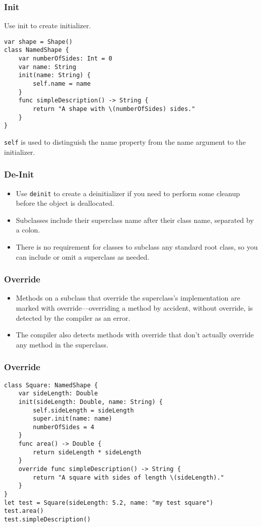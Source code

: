 \begin{frame}[fragile] \frametitle{Init}
Use init to create initializer.

\begin{lstlisting}
var shape = Shape()
class NamedShape {
    var numberOfSides: Int = 0
    var name: String
    init(name: String) {
        self.name = name
    }
    func simpleDescription() -> String {
        return "A shape with \(numberOfSides) sides."
    }
}
\end{lstlisting}

\lstinline|self| is used to distinguish the name property from the name argument to the initializer. 
\end{frame}


\begin{frame}[fragile] \frametitle{De-Init}
\begin{itemize}
\item Use \lstinline|deinit| to create a deinitializer if you need to perform some cleanup before the object is deallocated.
\item Subclasses include their superclass name after their class name, separated by a colon. 
\item There is no requirement for classes to subclass any standard root class, so you can include or omit a superclass as needed.
\end{itemize}


\end{frame}


\begin{frame}[fragile] \frametitle{Override}
\begin{itemize}
\item Methods on a subclass that override the superclass’s implementation are marked with override—overriding a method by accident, without override, is detected by the compiler as an error. 
\item The compiler also detects methods with override that don’t actually override any method in the superclass.
\end{itemize}


\end{frame}

\begin{frame}[fragile] \frametitle{Override}

\begin{lstlisting}
class Square: NamedShape {
    var sideLength: Double
    init(sideLength: Double, name: String) {
        self.sideLength = sideLength
        super.init(name: name)
        numberOfSides = 4
    }
    func area() -> Double {
        return sideLength * sideLength
    }
    override func simpleDescription() -> String {
        return "A square with sides of length \(sideLength)."
    }
}
let test = Square(sideLength: 5.2, name: "my test square")
test.area()
test.simpleDescription()
\end{lstlisting}

\end{frame}


